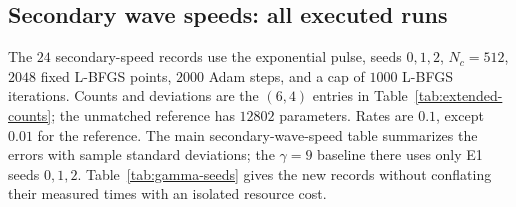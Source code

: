 \documentclass[11pt]{article}
\begin{document}
\subsection{Secondary wave speeds: all executed runs}

The $24$ secondary-speed records use the exponential pulse, seeds
$0,1,2$, $N_c=512$, $2048$ fixed L-BFGS points, $2000$ Adam steps, and
a cap of $1000$ L-BFGS iterations. Counts and deviations are the
$(6,4)$ entries in Table~\ref{tab:extended-counts}; the unmatched
reference has $12802$ parameters. Rates are $0.1$, except $0.01$ for
the reference. The main secondary-wave-speed table summarizes the errors
with sample standard deviations; the $\gamma=9$ baseline there uses
only E1 seeds $0,1,2$. Table~\ref{tab:gamma-seeds} gives the new records
without conflating their measured times with an isolated resource cost.
\end{document}
